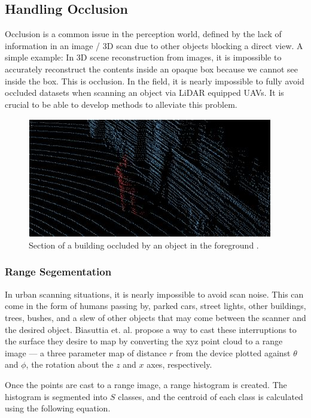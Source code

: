 \documentclass[12pt]{drexelthesis}
\let\Oldsubsection\subsection
\renewcommand{\subsection}{\FloatBarrier\Oldsubsection}
\let\Oldsubsubsection\subsubsection
\renewcommand{\subsubsection}{\FloatBarrier\Oldsubsubsection}
\begin{document}
\subsection{Handling Occlusion} 
Occlusion is a common issue in the perception world, defined by the lack of information in an image / 3D scan due to other objects blocking a direct view. A simple example: In 3D scene reconstruction from images, it is impossible to accurately reconstruct the contents inside an opaque box because we cannot see inside the box. This is occlusion. In the field, it is nearly impossible to fully avoid occluded datasets when scanning an object via LiDAR equipped UAVs. It is crucial to be able to develop methods to alleviate this problem.

\begin{figure}[!h]
\centering
\includegraphics{occluded_man.jpg}
\caption[Demonstration of occlusion]{\centering Section of a building occluded by an object in the foreground \cite{RN13}.}
\end{figure}

\subsubsection{Range Segementation}
\label{subsubsec:rangeseg}
In urban scanning situations, it is nearly impossible to avoid scan noise. This can come in the form of humans passing by, parked cars, street lights, other buildings, trees, bushes, and a slew of other objects that may come between the scanner and the desired object. Biasuttia et. al. propose a way to cast these interruptions to the surface they desire to map by converting the xyz point cloud to a range image --- a three parameter map of distance $r$ from the device plotted against $\theta$ and $\phi$, the rotation about the $z$ and $x$ axes, respectively.

Once the points are cast to a range image, a range histogram is created. The histogram is segmented into $S$ classes, and the centroid of each class is calculated using the following equation.
\end{document}
